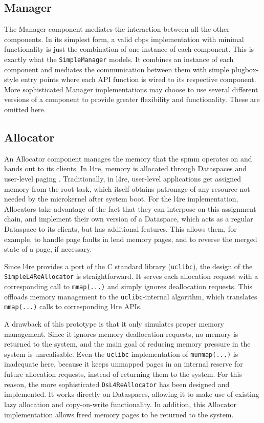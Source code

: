 \subsection*{Manager}
\label{subsec:manager}

The Manager component mediates the interaction between all the other components.
In its simplest form, a valid \ac{cbps} implementation with minimal functionality is just the combination of one instance of each component.
This is exactly what the \texttt{SimpleManager} models.
It combines an instance of each component and mediates the communication between them with simple plugbox-style entry points where each API function is wired to its respective component.
More sophisticated Manager implementations may choose to use several different versions of a component to provide greater flexibility and functionality.
These are omitted here.

\subsection*{Allocator}
\label{subsec:allocator}

An Allocator component manages the memory that the \ac{spmm} operates on and hands out to its clients.
In \ac{l4re}, memory is allocated through Dataspaces and user-level paging \cite{l4re-dataspace}.
Traditionally, in \ac{l4re}, user-level applications get assigned memory from the root task, which itself obtains patronage of any resource not needed by the microkernel after system boot.
For the \ac{l4re} implementation, Allocators take advantage of the fact that they can interpose on this assignment chain, and implement their own version of a Dataspace, which acts as a regular Dataspace to its clients, but has additional features.
This allows them, for example, to handle page faults in lend memory pages, and to reverse the merged state of a page, if necessary.

Since \ac{l4re} provides a port of the C standard library (\texttt{uclibc}), the design of the \texttt{Simple\-L4Re\-Allocator} is straightforward.
It serves each allocation request with a corresponding call to \texttt{mmap(...)} and simply ignores deallocation requests.
This offloads memory management to the \texttt{uclibc}-internal algorithm, which translates \texttt{mmap(...)} calls to corresponding \ac{l4re} APIs.

A drawback of this prototype is that it only simulates proper memory management.
Since it ignores memory deallocation requests, no memory is returned to the system, and the main goal of reducing memory pressure in the system is unrealisable.
Even the \texttt{uclibc} implementation of \texttt{munmap(...)} is inadequate here, because it keeps unmapped pages in an internal reserve for future allocation requests, instead of returning them to the system.
For this reason, the more sophisticated \texttt{Ds\-L4Re\-Allocator} has been designed and implemented.
It works directly on Dataspaces, allowing it to make use of existing lazy allocation and copy-on-write functionality.
In addition, this Allocator implementation allows freed memory pages to be returned to the system.

